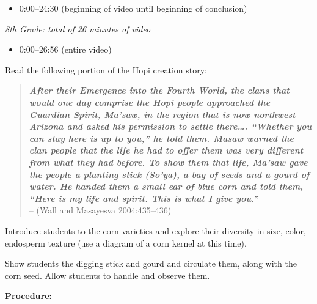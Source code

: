 \documentclass[12pt,]{article}
\providecommand{\tightlist}{%
  \setlength{\itemsep}{0pt}\setlength{\parskip}{0pt}}
\begin{document}
\begin{itemize}
\tightlist
\item
  0:00--24:30 (beginning of video until beginning of conclusion)
\end{itemize}

\emph{8th Grade: total of 26 minutes of video}

\begin{itemize}
\tightlist
\item
  0:00--26:56 (entire video)
\end{itemize}

Read the following portion of the Hopi creation story:

\begin{quote}
\textbf{\emph{After their Emergence into the Fourth World, the clans that would one
day comprise the Hopi people approached the Guardian Spirit, Ma'saw, in
the region that is now northwest Arizona and asked his permission to
settle there\ldots. ``Whether you can stay here is up to you,'' he told them.
Masaw warned the clan people that the life he had to offer them was very
different from what they had before. To show them that life, Ma'saw gave
the people a planting stick (So'ya), a bag of seeds and a gourd of
water. He handed them a small ear of blue corn and told them, ``Here is
my life and spirit. This is what I give you.''}}\\
-- (Wall and Masayesva 2004:435--436)
\end{quote}

Introduce students to the corn varieties and explore their diversity
in size, color, endosperm texture (use a diagram of a corn kernel at
this time).

Show students the digging stick and gourd and circulate them, along
with the corn seed. Allow students to handle and observe them.

\textbf{Procedure:}
\end{document}
